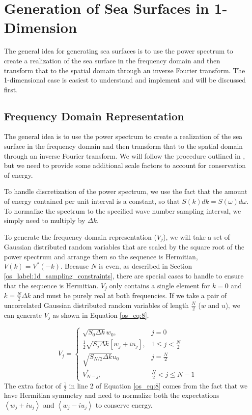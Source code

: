 \section{Generation of Sea Surfaces in 1-Dimension}\label{os_sec:1d}
The general idea for generating sea surfaces is to use the power spectrum to create a realization of the sea surface in the frequency domain and then transform that to the spatial domain through an inverse Fourier transform. The 1-dimensional case is easiest to understand and implement and will be discussed first.

\subsection{Frequency Domain Representation}
The general idea is to use the power spectrum to create a realization of the sea surface in the frequency domain and then transform that to the spatial domain through an inverse Fourier transform. We will follow the procedure outlined in \cite{percival_spectra}, 
but we need to provide some additional scale factors to account for conservation of energy.

To handle discretization of the power spectrum, we use the fact that the amount of energy contained per unit interval is a constant, so that $S(k)dk = S(\omega) d\omega$. To normalize the spectrum to the specified wave number sampling interval, we simply need to multiply by $\Delta k$.

To generate the frequency domain representation ($V_j$), we will take a set of Gaussian distributed random variables that are scaled  by the square root of the power spectrum and arrange them so the sequence is Hermitian, $V(k) = V^*(-k)$. Because $N$ is even, as described in Section \ref{os_label:1d_sampling_constraints}, there are special cases to handle to ensure that the sequence is Hermitian. $V_j$ only contains a single element for $k = 0$ and $k = \frac{N}{2}\Delta k$ and must be purely real at both frequencies. If we take a pair of uncorrelated Gaussian distributed random variables of length $\frac{N}{2}$ ($w$ and $u$), we can generate $V_j$ as shown in Equation \ref{os_eq:8}.

\begin{equation}
  \label{os_eq:8}   
  V_j = \begin{cases}
    \sqrt{S_0\Delta k}w_0, & j = 0 \\
    \frac{1}{2}\sqrt{S_j\Delta k}\left[w_j + iu_j \right], & 1 \leq j < \frac{N}{2} \\
   \sqrt{S_{N/2}\Delta k}u_0 & j = \frac{N}{2} \\
    V_{N-j}^*, &  \frac{N}{2} < j \leq N-1 
  \end{cases} 
\end{equation}
The extra factor of $\frac{1}{2}$ in line 2 of Equation \ref{os_eq:8} comes from the fact that we have Hermitian symmetry and need to normalize both the expectations $\left<w_j + iu_j\right>$ and $\left<w_j - iu_j\right>$ to conserve energy.

